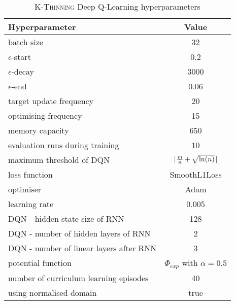 

\begin{table}[h]
\begin{threeparttable}
\centering
\begin{tabular}{l|c}
\toprule
Hyperparameter             &     Value \\
\midrule
batch size               &     32 \\ 
$\epsilon$-start               &    0.2 \\ 
$\epsilon$-decay         &     3000\\
$\epsilon$-end              &     0.06 \\
target update frequency               &     20 \\ 
optimising frequency          &     15 \\ 
memory capacity     &     650 \\
evaluation runs during training             &     10 \\
maximum threshold of DQN             &     $\lceil\frac{m}{n}+\sqrt{\ln(n)}\rceil$ \\ 
loss function               &     SmoothL1Loss \\ 
optimiser        &     Adam \\
learning rate             &     0.005 \\
DQN - hidden state size of RNN               &     128 \\ 
DQN - number of hidden layers of RNN         &     2 \\ 
DQN - number of linear layers after RNN     &     3 \\
potential function            &    $\Phi_{exp}$ with $\alpha=0.5$ \\
number of curriculum learning episodes            & 40 \\ 
using normalised domain               &     true \\ 
\bottomrule
\end{tabular}
\end{threeparttable}
\caption{\textsc{K-Thinning} Deep Q-Learning hyperparameters}
\label{tab:k-thinning-hyperparameters}
\end{table}



